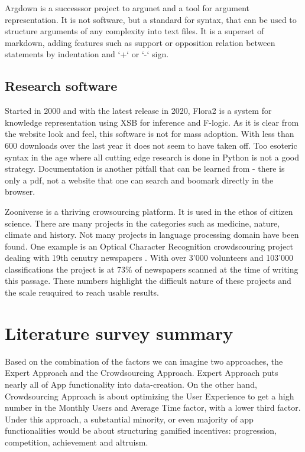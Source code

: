 \documentclass{report}
\begin{document}
Argdown \cite{noauthor_argdown_nodate} is a successsor project to argunet and a tool for argument representation. It is not software, but a standard for syntax, that can be used to structure arguments of any complexity into text files. It is a superset of markdown, adding features such as support or opposition relation between statements by indentation and `+` or `-` sign.


\subsection{Research software}

Started in 2000 and with the latest release in 2020,
Flora2 \cite{noauthor_flora-2_nodate} is a system for knowledge representation using XSB for inference and F-logic.
As it is clear from the website look and feel, this software is not for mass adoption.
With less than 600 downloads over the last year \cite{noauthor_flora-2_nodate-4} it does not seem to have taken off.
Too esoteric syntax in the age where all cutting edge research is done in Python is not a good strategy. Documentation is another pitfall that can be learned from - there is only a pdf, not a website that one can search and boomark directly in the browser. 

Zooniverse \cite{noauthor_zooniverse_nodate} is a thriving crowsourcing platform. It is used in the ethos of citizen science. There are many projects in the categories such as medicine, nature, climate and history.  Not many projects in language processing domain have been found. One example is an Optical Character Recognition crowdscouring project dealing with 19th cenutry newspapers \cite{noauthor_zooniverse_nodate-1}. With over 3'000 volunteers and 103'000 classifications the project is at 73\% of newspapers scanned at the time of writing this passage.
These numbers highlight the difficult nature of these projects and the scale reuquired to reach usable results.

\section{Literature survey summary}

Based on the combination of the factors we can imagine two approaches, the Expert Approach and the Crowdsourcing Approach.  Expert Approach puts nearly all of App functionality into data-creation. 
On the other hand, Crowdsourcing Approach is about optimizing the User Experience to get a high number in the Monthly Users and Average Time factor, with a lower third factor.  Under this approach, a substantial minority, or even majority of app functionalities would be about structuring gamified incentives: progression, competition, achievement and altruism.
\end{document}
